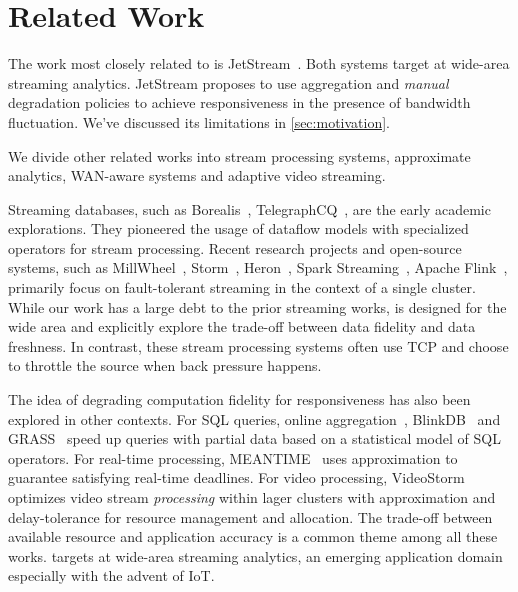 \section{Related Work}
\label{sec:related-work}

The work most closely related to \sysname{} is
JetStream~\cite{rabkin2014aggregation}. Both systems target at wide-area
streaming analytics. JetStream proposes to use aggregation and \textit{manual}
degradation policies to achieve responsiveness in the presence of bandwidth
fluctuation. We've discussed its limitations in \autoref{sec:motivation}.

We divide other related works into stream processing systems, approximate
analytics, WAN-aware systems and adaptive video streaming.

 Streaming databases, such as
Borealis~\cite{abadi2005design},
TelegraphCQ~\cite{chandrasekaran2003telegraphcq}, are the early academic
explorations. They pioneered the usage of dataflow models with specialized
operators for stream processing. Recent research projects and open-source
systems, such as MillWheel~\cite{akidau2013millwheel},
Storm~\cite{toshniwal2014storm}, Heron~\cite{sanjeev2015twitter}, Spark
Streaming~\cite{zaharia2013discretized}, Apache Flink~\cite{carbone2015apache},
primarily focus on fault-tolerant streaming in the context of a single
cluster. While our work has a large debt to the prior streaming works,
\sysname{} is designed for the wide area and explicitly explore the trade-off
between data fidelity and data freshness. In contrast, these stream processing
systems often use TCP and choose to throttle the source when back pressure
happens.

 The idea of degrading computation fidelity for
responsiveness has also been explored in other contexts. For SQL queries, online
aggregation~\cite{hellerstein1997online}, BlinkDB~\cite{agarwal2013blinkdb} and
GRASS~\cite{ananthanarayanan2014grass} speed up queries with partial data based
on a statistical model of SQL operators. For real-time processing,
MEANTIME~\cite{farrell2016meantime} uses approximation to guarantee satisfying
real-time deadlines. For video processing, VideoStorm~\cite{zhang2017live}
optimizes video stream \textit{processing} within lager clusters with
approximation and delay-tolerance for resource management and allocation. The
trade-off between available resource and application accuracy is a common theme
among all these works. \sysname{} targets at wide-area streaming analytics, an
emerging application domain especially with the advent of IoT.

